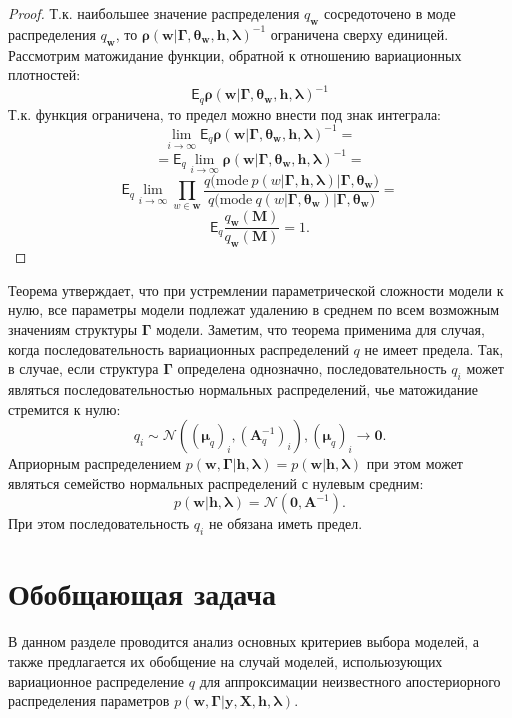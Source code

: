 \begin{proof}
Т.к. наибольшее значение распределения $q_\mathbf{w}$ сосредоточено в моде распределения $q_\mathbf{w}$, то $\boldsymbol{\rho}(\mathbf{w}|\boldsymbol{\Gamma}, \boldsymbol{\theta}_\mathbf{w}, \mathbf{h},\boldsymbol{\lambda})^{-1}$ ограничена сверху единицей. Рассмотрим матожидание функции, обратной к отношению вариационных плотностей:
\[
\mathsf{E}_q \boldsymbol{\rho}(\mathbf{w}|\boldsymbol{\Gamma}, \boldsymbol{\theta}_\mathbf{w}, \mathbf{h},\boldsymbol{\lambda})^{-1}
\] 
Т.к. функция ограничена, то предел можно внести под знак интеграла:
\[
\lim_{i \to \infty} \mathsf{E}_q \boldsymbol{\rho}(\mathbf{w}|\boldsymbol{\Gamma}, \boldsymbol{\theta}_\mathbf{w}, \mathbf{h},\boldsymbol{\lambda})^{-1} = 
\]
\[
 =\mathsf{E}_q  \lim_{i \to \infty}  \boldsymbol{\rho}(\mathbf{w}|\boldsymbol{\Gamma}, \boldsymbol{\theta}_\mathbf{w}, \mathbf{h},\boldsymbol{\lambda})^{-1} =
\]
\[
    \mathsf{E}_q \lim_{i \to \infty} \prod_{w \in \mathbf{w}}\frac{q\bigl(\text{mode}~p\left({w}|\boldsymbol{\Gamma}, \mathbf{h},\boldsymbol{\lambda}\right)|\boldsymbol{\Gamma},\boldsymbol{\theta}_\mathbf{w}\bigr)}{q\bigl(\text{mode}~q\left(w|\boldsymbol{\Gamma}, \boldsymbol{\theta}_\mathbf{w}\right)|\boldsymbol{\Gamma}, \boldsymbol{\theta}_\mathbf{w}\bigr)}=
\]
\[
     \mathsf{E}_q \frac{q_\mathbf{w}(\mathbf{M})}{q_\mathbf{w}(\mathbf{M})} = 1.
\]

\end{proof}

Теорема утверждает, что при устремлении параметрической сложности модели к нулю, все параметры модели подлежат удалению в среднем по всем возможным значениям  структуры $\boldsymbol{\Gamma}$ модели. Заметим, что теорема применима для случая, когда последовательность вариационных распределений $q$ не имеет предела. Так, в случае, если структура $\boldsymbol{\Gamma}$ определена однозначно, последовательность $q_i$ может являться последовательностью нормальных распределений, чье матожидание стремится к нулю:
\[
    q_i \sim \mathcal{N}((\boldsymbol{\mu}_q)_i, (\mathbf{A}^{-1}_q)_i), (\boldsymbol{\mu}_q)_i \to \mathbf{0}.
\]
Априорным распределением $p(\mathbf{w},\boldsymbol{\Gamma}|\mathbf{h},\boldsymbol{\lambda}) = p(\mathbf{w}|\mathbf{h},\boldsymbol{\lambda})$ при этом может являться семейство нормальных распределений с нулевым средним:
\[
    p(\mathbf{w}|\mathbf{h},\boldsymbol{\lambda}) = \mathcal{N}(\mathbf{0}, \mathbf{A}^{-1}).
\]
При этом последовательность $q_i$ не обязана иметь предел.

\section{Обобщающая задача}
В данном разделе проводится анализ основных критериев выбора моделей, а также предлагается их обобщение на случай моделей, испольюзующих вариационное распределение $q$ для аппроксимации неизвестного апостериорного распределения параметров $p(\mathbf{w}, \boldsymbol{\Gamma}|\mathbf{y}, \mathbf{X}, \mathbf{h}, \boldsymbol{\lambda})$.

